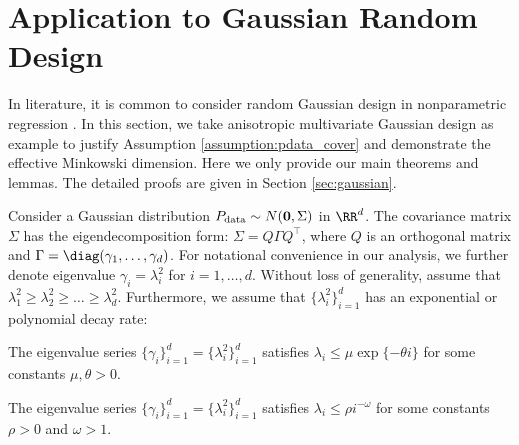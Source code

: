 \section{Application to Gaussian Random  Design}\label{sec:example}

In literature, it is common to consider random Gaussian  design in nonparametric regression \citep{anderson1962introduction,muller2006linear,chatfield2018introduction}. In this section, we take anisotropic multivariate Gaussian design as example to justify Assumption \ref{assumption:pdata_cover} and demonstrate the effective Minkowski dimension. Here we only provide our main theorems and lemmas. The detailed proofs are given in Section \ref{sec:gaussian}. 

Consider a Gaussian distribution $P_{\rm data} \sim N(\bold{0},\Sigma)$ in $\RR^d$. The covariance matrix $\Sigma$ has the eigendecomposition form: $\Sigma =Q\Gamma Q^\top$, where $Q$ is an orthogonal matrix and $\Gamma = \diag(\gamma_1,\ldots,\gamma_d)$. For notational convenience in our analysis, we further denote eigenvalue $\gamma_i=\lambda_i^2$ for $i=1,\ldots,d$. Without loss of generality, assume that $\lambda_1^2\geq \lambda_2^2 \geq \ldots \geq \lambda_d^2$. Furthermore, we assume that $\{ \lambda_i^2 \}_{i=1}^d$ has an exponential or polynomial decay rate:
\begin{assumption}\label{assump:eigen-decay-exp}
    The eigenvalue series $\{\gamma_i \}_{i=1}^d=\{\lambda_i^2 \}_{i=1}^d$ satisfies $\lambda_i \leq \mu \exp\{-\theta i\}$ for some constants $\mu,\theta>0$.
\end{assumption}
\begin{assumption}\label{assump:eigen-decay-poly}
    The eigenvalue series $\{\gamma_i \}_{i=1}^d=\{\lambda_i^2 \}_{i=1}^d$ satisfies $\lambda_i \leq \rho i^{-\omega}$ for some constants $\rho>0$ and $\omega > 1$.
\end{assumption}


